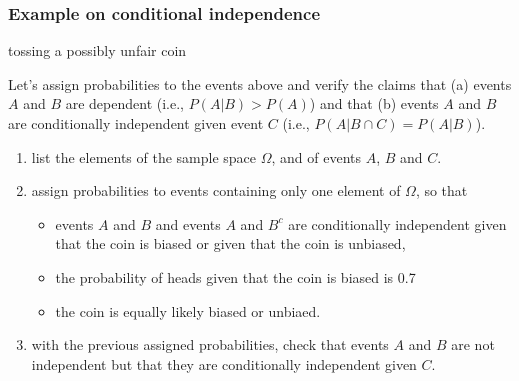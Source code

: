 \begin{frame}
    \frametitle{Example on conditional independence}

    \scriptsize
    \begin{manualProbExample}{tossing a possibly unfair coin}

        Let's assign probabilities to the events above and verify the claims
        that (a) events $A$ and $B$ are dependent (i.e., $P(A|B)>P(A)$) and
        that (b) events $A$ and $B$ are conditionally independent given event
        $C$ (i.e., $P(A|B\cap C)=P(A|B)$).

        \begin{enumerate}[a]

            \item list the elements of the sample space $\Omega$, and of events $A$, $B$ and $C$.

            \item assign probabilities to events containing only one element of
                $\Omega$, so that 

                \begin{itemize}
                    \scriptsize

                    \item events $A$ and $B$  and events $A$ and $B^c$ are
                        conditionally independent given that the coin is biased
                        or given that the coin is unbiased,

                    \item the probability of heads given that the coin is
                        biased is 0.7

                    \item the coin is equally likely biased or unbiaed.

                \end{itemize}

            \item with the previous assigned probabilities, check that events
                $A$ and $B$ are not independent but that they are conditionally
                independent given $C$.

        \end{enumerate}

    \end{manualProbExample}
    \normalsize

\end{frame}


